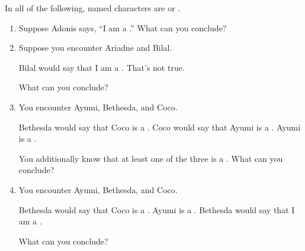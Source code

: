 \probsec{~\ref{sec:knights-knaves}}

  In all of the following, named characters are \knights or \knaves.

\begin{enumerate}
  \item Suppose Adonis says, ``I am a \knight.'' What can you conclude?

  \item Suppose you encounter Ariadne and Bilal.
  \begin{dialogue}
     Bilal would say that I am a \knight.
     That's not true.
  \end{dialogue}
  What can you conclude?

  \item You encounter Ayumi, Bethesda, and Coco.
  \begin{dialogue}
     Bethesda would say that Coco is a \knave.
     Coco would say that Ayumi is a \knave.
     Ayumi is a \knight.
  \end{dialogue} 
  You additionally know that at least one of the three is a \knight. What can you conclude?

  \item You encounter Ayumi, Bethesda, and Coco.
  \begin{dialogue}
     Bethesda would say that Coco is a \knave.
     Ayumi is a \knave.
     Bethesda would say that I am a \knave.
  \end{dialogue}
  What can you conclude?
\end{enumerate}

